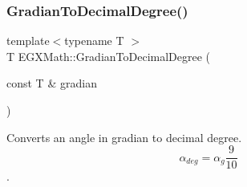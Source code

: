 \mbox{\label{group___e_g_x_math-_conversions-_angle_conversions-_gradian_ga346f47c519d5261b689cec49f4a8e789}} 
\subsubsection{\texorpdfstring{Gradian\+To\+Decimal\+Degree()}{GradianToDecimalDegree()}}
{\footnotesize\ttfamily template$<$typename T $>$ \\
T E\+G\+X\+Math\+::\+Gradian\+To\+Decimal\+Degree (\begin{DoxyParamCaption}\item[{const T \&}]{gradian }\end{DoxyParamCaption})}



Converts an angle in gradian to decimal degree. \[\alpha_{deg}=\alpha_{g}\frac{9}{10}\]. 

